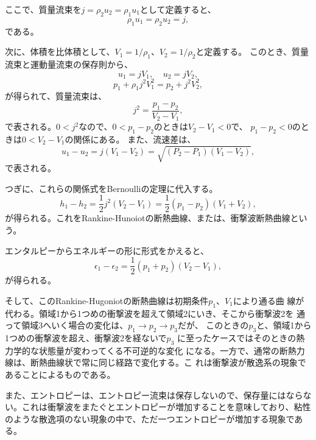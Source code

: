 ここで、質量流束を$j = \rho_2u_2 = \rho_1u_1$として定義すると、
\begin{equation}
 \rho_1u_1 = \rho_2u_2 = j,
\end{equation}
である。

次に、体積を比体積として、$V_1 = 1/\rho_1$、$V_2 = 1/\rho_2$と定義する。
このとき、質量流束と運動量流束の保存則から、
\begin{equation}
 u_1 = j V_1,\mspace{20mu}
  u_2 = j V_2,
\end{equation}
\begin{equation}
 p_1 + \rho_1 j^2 V_1^2 = p_2 + j^2V_2^2,
\end{equation}
が得られて、質量流束は、
\begin{equation}
 j^2 = \frac{p_1 - p_2}{V_2 - V_1},
\end{equation}
で表される。$0 < j^2$なので、$0 < p_1 - p_2$のときは$V_2 - V_1 < 0$で、
$p_1 - p_2 < 0$のときは$0 < V_2 - V_1$の関係にある。
また、流速差は、
\begin{equation}
 u_1 - u_2 
  = j \left(V_1 - V_2\right)
  = \sqrt{(P_2 - P_1) (V_1 - V_2)},
\end{equation}
で表される。

つぎに、これらの関係式をBernoulliの定理に代入する。
\begin{equation}
 h_1 - h_2 
  = \frac{1}{2}j^2 (V_2 - V_1)
  = \frac{1}{2}(p_1 - p_2) (V_1 + V_2),
\end{equation}
が得られる。これをRankine-Hunoiotの断熱曲線、または、衝撃波断熱曲線とい
う。

エンタルピーからエネルギーの形に形式をかえると、
\begin{equation}
 \epsilon_1 - \epsilon_2
  = \frac{1}{2}(p_1 + p_2) (V_2 - V_1),
\end{equation}
が得られる。

そして、このRankine-Hugoniotの断熱曲線は初期条件$p_1$、$V_1$により通る曲
線が代わる。領域1から1つめの衝撃波を超えて領域2にいき、そこから衝撃波2を
通って領域3へいく場合の変化は、$p_1\rightarrow p_2\rightarrow p_3$だが、
このときの$p_3$と、領域1から1つめの衝撃波を超え、衝撃波2を経ないで$p_3$
に至ったケースではそのときの熱力学的な状態量が変わってくる不可逆的な変化
になる。一方で、通常の断熱力線は、断熱曲線状で常に同じ経路で変化する。こ
れは衝撃波が散逸系の現象であることによるものである。

また、エントロピーは、エントロピー流束は保存しないので、保存量にはならな
い。これは衝撃波をまたぐとエントロピーが増加することを意味しており、粘性
のような散逸項のない現象の中で、ただ一つエントロピーが増加する現象である。

